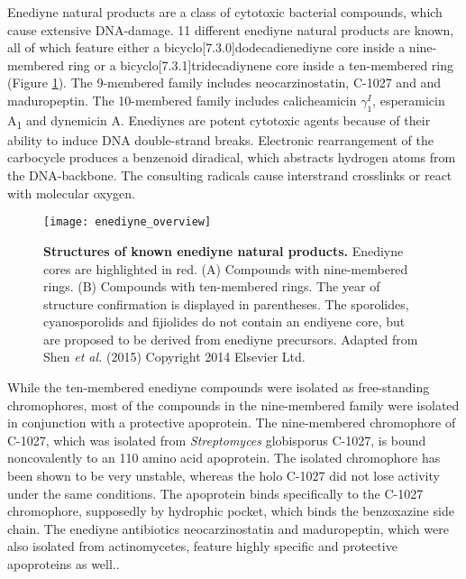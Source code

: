  Enediyne natural products are a class of cytotoxic bacterial compounds, which cause extensive DNA-damage.\autocite{Liang2010,Gredicak2007,AdrianL.Smith*1996,Nicolaou1993}
 11 different enediyne natural products are known, all of which feature either a bicyclo[7.3.0]dodecadienediyne core inside a nine-membered ring or a bicyclo[7.3.1]tridecadiynene core inside a ten-membered ring (Figure \ref{fig:enediyne_comparison}).
 The 9-membered family includes neocarzinostatin, C-1027 and and maduropeptin.
 The 10-membered family includes calicheamicin $\gamma_{1}^{I}$, esperamicin A\textsubscript{1} and dynemicin A.\autocite{Liang2010}
 Enediynes are potent cytotoxic agents because of their ability to induce DNA double-strand breaks.\autocite{Shen2015}
 Electronic rearrangement of the carbocycle produces a benzenoid diradical, which abstracts hydrogen atoms from the DNA-backbone.
 The consulting radicals cause interstrand crosslinks or react with molecular oxygen.
 \begin{figure}[htbp]
 	\centering
 	\texttt{[image: enediyne\_overview]}
 	\caption[Structures of known enediyne natural products]{%
 		\textbf{Structures of known enediyne natural products.}
 		Enediyne cores are highlighted in red.
 		(A) Compounds with nine-membered rings.
 		(B) Compounds with ten-membered rings.
 		The year of structure confirmation is displayed in parentheses.
 		The sporolides, cyanosporolids and fijiolides do not contain an endiyene core, but are proposed to be derived from enediyne precursors.
 		Adapted from Shen \textit{et al.} (2015) Copyright 2014 Elsevier Ltd.}
 	\label{fig:enediyne_comparison}
 \end{figure}
 While the ten-membered enediyne compounds were isolated as free-standing chromophores, most of the compounds in the nine-membered family were isolated in conjunction with a protective apoprotein.\autocite{Liang2010}
 The nine-membered chromophore of C-1027, which was isolated from \textit{Streptomyces} globisporus C-1027, is bound noncovalently to an 110 amino acid apoprotein.\autocite{AdrianL.Smith*1996,Minami1993,Yoshida1993,Otani1993,Sugiura1993,Matsumoto1993,Otani1991,Otani1988a,Matsumoto1993a}
 The isolated chromophore has been shown to be very unstable, whereas the holo C-1027 did not lose activity under the same conditions.\autocite{Matsumoto1993,Sugiura1993,Otani1991}
 The apoprotein binds specifically to the C-1027 chromophore, supposedly by hydrophic pocket, which binds the benzoxazine side chain.\autocite{Okuno1994,Matsumoto1993}
 The enediyne antibiotics neocarzinostatin and maduropeptin, which were also isolated from actinomycetes, feature highly specific and protective apoproteins as well.\autocite{AdrianL.Smith*1996}.

